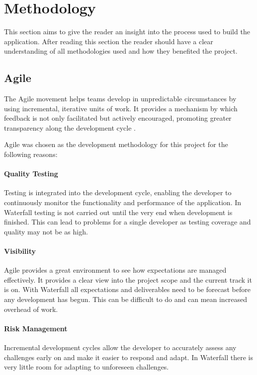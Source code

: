 \section{Methodology}
\label{sec:methodology}
This section aims to give the reader an insight into the process used to build the application. After reading this section the reader should have a clear understanding of all methodologies used and how they benefited the project.

\subsection{Agile}
\label{sub:agile}
The Agile movement helps teams develop in unpredictable circumstances by using incremental, iterative units of work. It provides a mechanism by which feedback is not only facilitated but actively encouraged, promoting greater transparency along the development cycle \citep{Agile2016}.

Agile was chosen as the development methodology for this project for the following reasons:

\paragraph{Quality Testing} Testing is integrated into the development cycle, enabling the developer to continuously monitor the functionality and performance of the application. In Waterfall testing is not carried out until the very end when development is finished. This can lead to problems for a single developer as testing coverage and quality may not be as high. 

\paragraph{Visibility} Agile provides a great environment to see how expectations are managed effectively. It provides a clear view into the project scope and the current track it is on. With Waterfall all expectations and deliverables need to be forecast before any development has begun. This can be difficult to do and can mean increased overhead of work.

\paragraph{Risk Management} Incremental development cycles allow the developer to accurately assess any challenges early on and make it easier to respond and adapt. In Waterfall there is very little room for adapting to unforeseen challenges.

